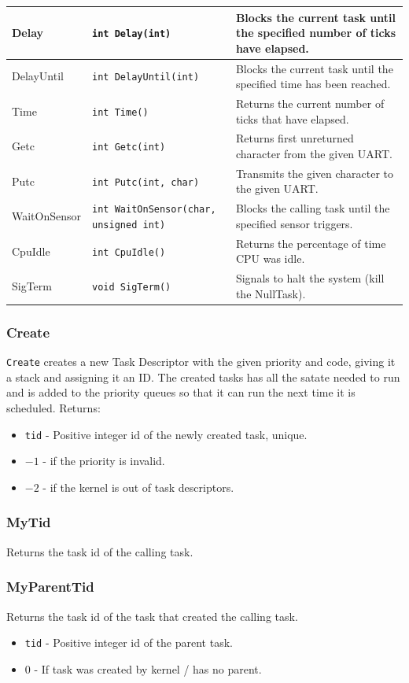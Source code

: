 \documentclass[12pt]{article}
\begin{document}
\begin{longtable}{|l|p{}|p{}|}
  Delay & \texttt{int Delay(int)} & Blocks the current task until the specified number of ticks have elapsed. \\\hline
  DelayUntil & \texttt{int DelayUntil(int)} & Blocks the current task until the specified time has been reached. \\\hline
  Time & \texttt{int Time()} & Returns the current number of ticks that have elapsed. \\\hline
  Getc & \texttt{int Getc(int)} & Returns first unreturned character from the given UART. \\\hline
  Putc & \texttt{int Putc(int, char)} & Transmits the given character to the given UART. \\\hline
  WaitOnSensor & \texttt{int WaitOnSensor(char, unsigned int)} & Blocks the calling task until the specified sensor triggers. \\\hline
  CpuIdle & \texttt{int CpuIdle()} & Returns the percentage of time CPU was idle. \\\hline
  SigTerm & \texttt{void SigTerm()} & Signals to halt the system (kill the NullTask). \\\hline
\end{longtable}
\vspace{1cm}
\subsubsection{Create}
\texttt{Create} creates a new Task Descriptor with the given priority and code, giving it a stack and assigning it an ID.  The created tasks has all the satate needed to run and is added to the priority queues so that it can run the next time it is scheduled.  Returns:
\begin{itemize}
  \item \texttt{tid} - Positive integer id of the newly created task, unique.
  \item $-1$ - if the priority is invalid.
  \item $-2$ - if the kernel is out of task descriptors.
    \\
\end{itemize}
\subsubsection{MyTid}
Returns the task id of the calling task.
\\
\subsubsection{MyParentTid}
Returns the task id of the task that created the calling task.
\begin{itemize}
  \item \texttt{tid} - Positive integer id of the parent task.
  \item $0$ - If task was created by kernel / has no parent.
    \\
\end{itemize}
\end{document}

